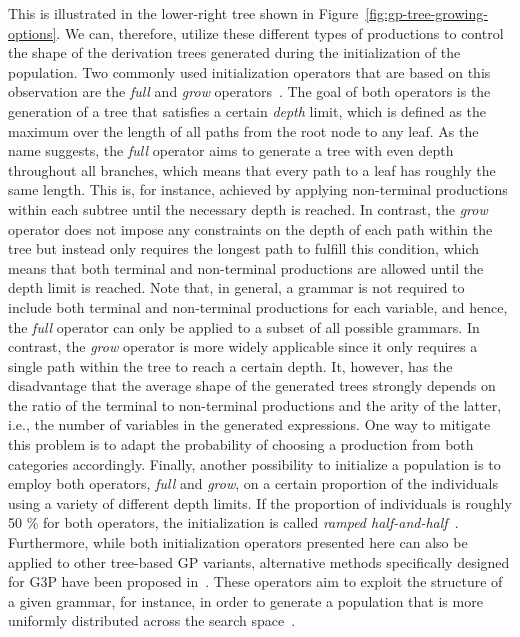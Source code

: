This is illustrated in the lower-right tree shown in Figure~\ref{fig:gp-tree-growing-options}. 
We can, therefore, utilize these different types of productions to control the shape of the derivation trees generated during the initialization of the population.
Two commonly used initialization operators that are based on this observation are the \emph{full} and \emph{grow} operators~\cite{poli2008field}.  
The goal of both operators is the generation of a tree that satisfies a certain \emph{depth} limit, which is defined as the maximum over the length of all paths from the root node to any leaf.
As the name suggests, the \emph{full} operator aims to generate a tree with even depth throughout all branches, which means that every path to a leaf has roughly the same length.
This is, for instance, achieved by applying non-terminal productions within each subtree until the necessary depth is reached.
In contrast, the \emph{grow} operator does not impose any constraints on the depth of each path within the tree but instead only requires the longest path to fulfill this condition, which means that both terminal and non-terminal productions are allowed until the depth limit is reached.
Note that, in general, a grammar is not required to include both terminal and non-terminal productions for each variable, and hence, the \emph{full} operator can only be applied to a subset of all possible grammars.
In contrast, the \emph{grow} operator is more widely applicable since it only requires a single path within the tree to reach a certain depth. 
It, however, has the disadvantage that the average shape of the generated trees strongly depends on the ratio of the terminal to non-terminal productions and the arity of the latter, i.e., the number of variables in the generated expressions.
One way to mitigate this problem is to adapt the probability of choosing a production from both categories accordingly.
Finally, another possibility to initialize a population is to employ both operators, \emph{full} and \emph{grow}, on a certain proportion of the individuals using a variety of different depth limits. 
If the proportion of individuals is roughly 50 \% for both operators, the initialization is called \emph{ramped half-and-half}~\cite{poli2008field,koza1994genetic}.
Furthermore, while both initialization operators presented here can also be applied to other tree-based GP variants, alternative methods specifically designed for G3P have been proposed in~\cite{garcia2006initialization,criado2020grammatically}.
These operators aim to exploit the structure of a given grammar, for instance, in order to generate a population that is more uniformly distributed across the search space~\cite{criado2020grammatically}.

